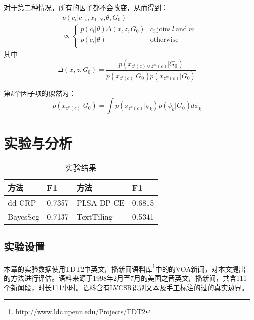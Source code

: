 对于第二种情况，所有的因子都不会改变，从而得到：
\begin{equation}
\begin{split}
&p(c_i|c_{-i},x_{1:N},\theta,G_0)\\
&\propto\left\{
\begin{array}{ll}
p(c_i|\theta)\Delta(x,z,G_0)  & c_i\ \text{joins} \ l\ \text{and} \ m\\
p(c_i|\theta)   & \text{otherwise} \\
\end{array}
\right.
\end{split}
\end{equation}
其中
\begin{equation}\Delta(x,z,G_0)=\frac{p(x_{z^{l}(c)\cup z^{m}(c)}|G_0)}{p(x_{z^{l}(c)}|G_0)p(x_{z^{m}(c)}|G_0)}\end{equation}

第$k$个因子项的似然为：
\begin{equation}
p(x_{z^{k}(c)}|G_0) = \int p(x_{z^{k}(c)}|\phi_k)p(\phi_k|G_0)d\phi_k
\end{equation}


\section{实验与分析}

\begin{table}
\begin{center}\small
\begin{tabular}{|l|l|l|l|}
\hline \bf 方法 & \bf F1 & \bf 方法 & \bf F1 \\ \hline
dd-CRP & 0.7357 & PLSA-DP-CE &  0.6815 \\ \hline
BayesSeg &  0.7137 & TextTiling & 0.5341 \\ \hline
\end{tabular}
\end{center}
\caption{实验结果}
\vspace{-2pt}\label{table:sg_result}
\end{table}
\subsection{实验设置}
本章的实验数据使用TDT2中英文广播新闻语料库\footnote{http://www.ldc.upenn.edu/Projects/TDT2}中的的VOA新闻，对本文提出的方法进行评估。语料来源于1998年2月至7月的美国之音英文广播新闻，共含111个新闻段，时长111小时。语料含有LVCSR识别文本及手工标注的过的真实边界。

